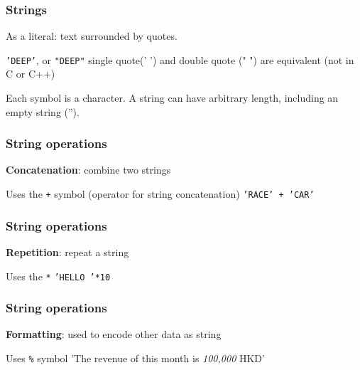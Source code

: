 \documentclass[11pt]{beamer}
\begin{document}
\begin{frame}
  \frametitle{Strings}
  \Enlarge

  \begin{itemize}
  \myitem  As a literal:  text surrounded by quotes.
    \begin{itemize}
    \mysubitem  \texttt{'DEEP'}, or \texttt{"DEEP"} \pause
    \mysubitem single quote(' ') and double quote (" ") are equivalent (not in C or C++)
    \end{itemize}\pause
  \myitem  Each symbol is a character.
  \myitem  A string can have arbitrary length, including an empty string ('').
  \end{itemize}
\end{frame}


\begin{frame}
  \frametitle{String operations}
  \Enlarge

  \begin{itemize}
  \myitem  \textbf{Concatenation}:  combine two strings
    \begin{itemize}
    \mysubitem  Uses the \texttt{+} symbol (operator for string concatenation) \pause
    \mysubitem  \texttt{'RACE' + 'CAR'}
    \end{itemize}
  \end{itemize}
\end{frame}


\begin{frame}
  \frametitle{String operations}
  \Enlarge

  \begin{itemize}
  \myitem  \textbf{Repetition}:  repeat a string
    \begin{itemize}
    \mysubitem  Uses the \texttt{*}
    \mysubitem  \texttt{'HELLO '*10}
    \end{itemize}
  \end{itemize}
\end{frame}


\begin{frame}
  \frametitle{String operations}
  \Enlarge

  \begin{itemize}
  \myitem  \textbf{Formatting}:  used to encode other data as string
    \begin{itemize}
    \mysubitem  Uses \texttt{\%} symbol
    \mysubitem 'The revenue of this month is \emph{\textcolor{CS101GradBot}{100,000}} HKD'
    \end{itemize}
  \end{itemize}
\end{frame}
\end{document}
